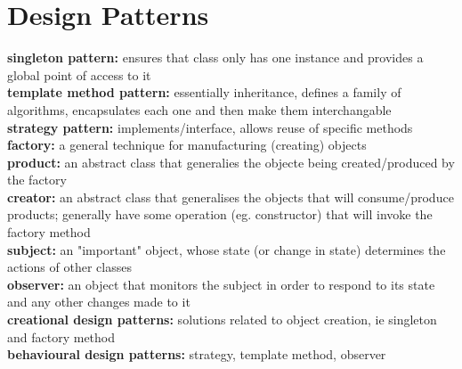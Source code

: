 \documentclass[a4paper,10pt]{article}
\begin{document}
 \section{Design Patterns}
\textcolor{Melon}{\textbf{singleton pattern:}} ensures that class only has one instance and provides a global point of access to it \\
\textcolor{Melon}{\textbf{template method pattern:}} essentially inheritance, defines a family of algorithms, encapsulates each one and then make them interchangable \\ 
\textcolor{Melon}{\textbf{strategy pattern:}} implements/interface, allows reuse of specific methods \\ 
\textcolor{Melon}{\textbf{factory:}} a general technique for manufacturing (creating) objects \\ 
\textcolor{Melon}{\textbf{product:}} an abstract class that generalies the objecte being created/produced by the factory \\ 
\textcolor{Melon}{\textbf{creator:}} an abstract class that generalises the objects that will consume/produce products; generally have some operation (eg. constructor) that will invoke the factory method \\ 
\textcolor{Melon}{\textbf{subject:}} an "important" object, whose state (or change in state) determines the actions of other classes\\ 
\textcolor{Melon}{\textbf{observer:}} an object that monitors the subject in order to respond to its state and any other changes made to it \\  
\textcolor{Melon}{\textbf{creational design patterns:}} solutions related to object creation, ie singleton and factory method \\ 
\textcolor{Melon}{\textbf{behavioural design patterns:}} strategy, template method, observer \\ 

\newpage
\end{document}
